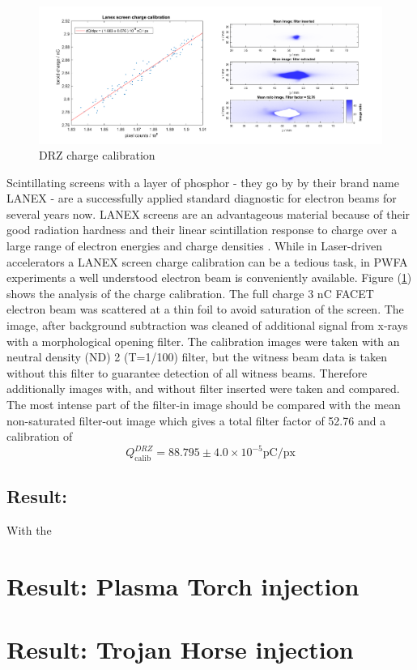\newpage

\begin{figure}[htbp]
\includegraphics[width=1.0\textwidth]{experiment/images/edited/DRZ_charge_calib.pdf}
\caption{DRZ charge calibration}
\label{img:DRZ_ChargeCalib}
\end{figure}


Scintillating screens with a layer of phosphor - they go by by their brand name LANEX - are a successfully applied standard diagnostic for electron beams for several years now.
LANEX screens are an advantageous material because of their good radiation hardness and 
their linear scintillation response to charge over a large range of electron energies and charge densities \cite{buck2010LANEX}. While in Laser-driven accelerators a LANEX screen charge calibration can be a tedious task, in PWFA experiments a well understood electron beam is conveniently available. Figure (\ref{img:DRZ_ChargeCalib}) shows the analysis of the charge calibration. The full charge 3 nC FACET electron beam was scattered at a thin foil to avoid saturation of the screen. The image, after background subtraction was cleaned of additional signal from x-rays with a morphological opening filter. The calibration images were taken with an neutral density (ND) 2 (T=1/100) filter, but the witness beam data  is taken without this filter to guarantee detection of all witness beams. 
Therefore additionally images with, and without filter inserted were taken and compared. 
The most intense part of the filter-in image should be compared with the mean non-saturated filter-out image which gives a total filter factor of 52.76 and a calibration of 
\begin{equation}
Q_\mathrm{calib}^{DRZ}=88.795\pm 4.0 \times 10^{-5} \mathrm{pC/px}
\end{equation}





\subsection*{Result:}
With the 
\section{Result: Plasma Torch injection}
\section{Result: Trojan Horse injection}